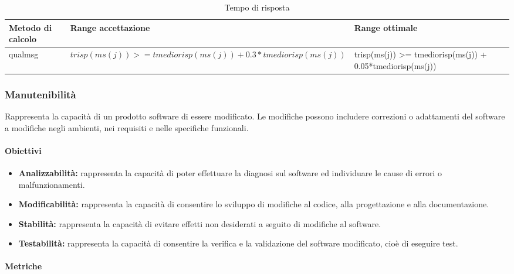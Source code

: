 			\begin{table}[H]
				\begin{longtable}{>{\centering\arraybackslash}p{5cm}|>{\centering\arraybackslash}p{5cm} | >{\centering\arraybackslash}p{5cm}}
					\hline
					\rowcolor{Gray}
					\textbf{Metodo di calcolo} & \textbf{Range accettazione} & \textbf{Range ottimale} \\
					\hline
					qualmsg &\begin{math}trisp(ms(j)) >= tmediorisp(ms(j)) + 0.3*tmediorisp(ms(j)) \end{math}& trisp(ms(j)) >= tmediorisp(ms(j)) + 0.05*tmediorisp(ms(j))
				\end{longtable}
				\caption{Tempo di risposta}
			\end{table}
						
	
			
	\subsubsection{Manutenibilità}
	Rappresenta la capacità di un prodotto software di essere modificato. Le modifiche possono includere correzioni o adattamenti del software a modifiche negli ambienti, nei requisiti e nelle specifiche funzionali.
	
		\paragraph{Obiettivi}
			\begin{itemize}
				\item \textbf{Analizzabilità:} rappresenta la capacità di poter effettuare la diagnosi sul software ed individuare le cause di errori o malfunzionamenti.
				\item \textbf{Modificabilità:} rappresenta la capacità di consentire lo sviluppo di modifiche al codice, alla progettazione e alla documentazione.
				\item \textbf{Stabilità:} rappresenta la capacità di evitare effetti non desiderati a seguito di modifiche al software.
				\item \textbf{Testabilità:} rappresenta la capacità di consentire la verifica e la validazione del software modificato, cioè di eseguire test.
			\end{itemize}
	
		\paragraph{Metriche}

